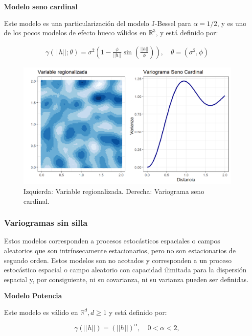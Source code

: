 \documentclass[
]{book}
\begin{document}
\textbf{Modelo seno cardinal}

Este modelo es una particularización del modelo J-Bessel para \(\alpha=1/2\), y es uno de los pocos modelos de efecto hueco válidos en \(\mathbb{R}^3\), y está definido por:

\begin{align*}
    \gamma(||h||;\theta)=\sigma^2 \left(1-\frac{\phi}{||h||}\sin\left(\frac{||h||}{\phi} \right)  \right),\quad \theta=(\sigma^2,\phi)
\end{align*}

\begin{figure}
\includegraphics[width=17.78in]{figuras/otros/sin_var} \caption{Izquierda: Variable regionalizada. Derecha: Variograma seno cardinal.}\label{fig:sinvar}
\end{figure}

\hypertarget{variogramas-sin-silla}{%
\subsubsection*{Variogramas sin silla}\label{variogramas-sin-silla}}

Estos modelos corresponden a procesos estocásticos espaciales o campos aleatorios que son intrínsecamente estacionarios, pero no son estacionarios de segundo orden. Estos modelos son no acotados y corresponden a un proceso estocástico espacial o campo aleatorio con capacidad ilimitada para la dispersión espacial y, por consiguiente, ni su covarianza, ni su varianza pueden ser definidas.

\textbf{Modelo Potencia}

Este modelo es válido en \(\mathbb{R}^d,d\geq 1\) y está definido por:

\[
          \gamma(||h||)=(||h||)^\alpha,\quad  0<\alpha<2, 
\]
\end{document}
